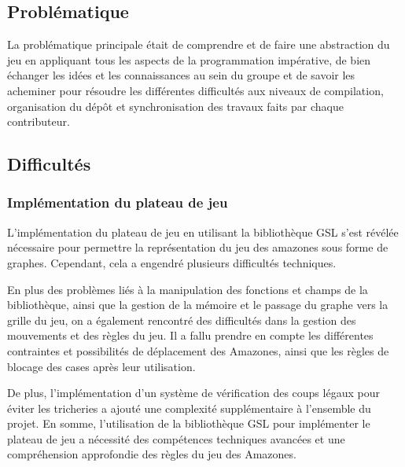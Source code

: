 \documentclass[11pt]{article}
\begin{document}
        \subsection {Problématique}
             La problématique principale était de comprendre et de faire une abstraction du jeu en appliquant tous les aspects de la programmation impérative, de bien échanger les idées et les connaissances au sein du groupe et de savoir les acheminer pour résoudre les différentes difficultés aux niveaux de compilation, organisation du dépôt et synchronisation des travaux faits par chaque contributeur. 
        \subsection{Difficultés}
            \subsubsection{Implémentation du plateau de jeu}
            L'implémentation du plateau de jeu en utilisant la bibliothèque GSL s'est révélée nécessaire pour permettre la représentation du jeu des amazones sous forme de graphes. Cependant, cela a engendré plusieurs difficultés techniques.

            En plus des problèmes liés à la manipulation des fonctions et champs de la bibliothèque, ainsi que la gestion de la mémoire et le passage du graphe vers la grille du jeu, on a également rencontré des difficultés dans la gestion des mouvements et des règles du jeu. Il a fallu prendre en compte les différentes contraintes et possibilités de déplacement des Amazones, ainsi que les règles de blocage des cases après leur utilisation.

            De plus, l'implémentation d'un système de vérification des coups légaux pour éviter les tricheries a ajouté une complexité supplémentaire à l'ensemble du projet. En somme, l'utilisation de la bibliothèque GSL pour implémenter le plateau de jeu a nécessité des compétences techniques avancées et une compréhension approfondie des règles du jeu des Amazones.
\end{document}

